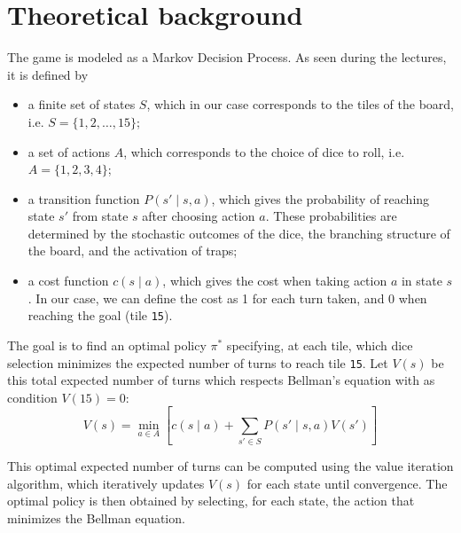 \documentclass[12pt, twocolumn]{article}
\begin{document}


\section*{Theoretical background}

The game is modeled as a Markov Decision Process. As seen during the lectures, it is defined by \autocite{brandimarte2021shortest}
\begin{itemize}
    \item a finite set of states $S$, which in our case corresponds to the tiles of the board, i.e. $S = \{1, 2, \dots, 15\}$;
    \item a set of actions $A$, which corresponds to the choice of dice to roll, i.e. $A = \{1, 2, 3, 4\}$;
    \item a transition function $P(s' \mid s, a)$, which gives the probability of reaching state $s'$ from state $s$ after choosing action $a$. These probabilities are determined by the stochastic outcomes of the dice, the branching structure of the board, and the activation of traps;
    \item a cost function $c(s \mid a)$, which gives the cost when taking action $a$ in state $s$. In our case, we can define the cost as 1 for each turn taken, and 0 when reaching the goal (tile \texttt{15}).
\end{itemize}

\noindent The goal is to find an optimal policy $\pi^*$ specifying, at each tile, which dice selection minimizes the expected number of turns to reach tile \texttt{15}. Let $V(s)$ be this total expected number of turns which respects Bellman's equation with as condition $V(15)=0$:
\begin{equation*}
    V(s) = \min_{a \in A} \left[ c(s \mid a) + \sum_{s' \in S} P(s' \mid s, a) V(s') \right]
\end{equation*}


\noindent This optimal expected number of turns can be computed using the value iteration algorithm, which iteratively updates $V(s)$ for each state until convergence. The optimal policy is then obtained by selecting, for each state, the action that minimizes the Bellman equation. \\
\end{document}
